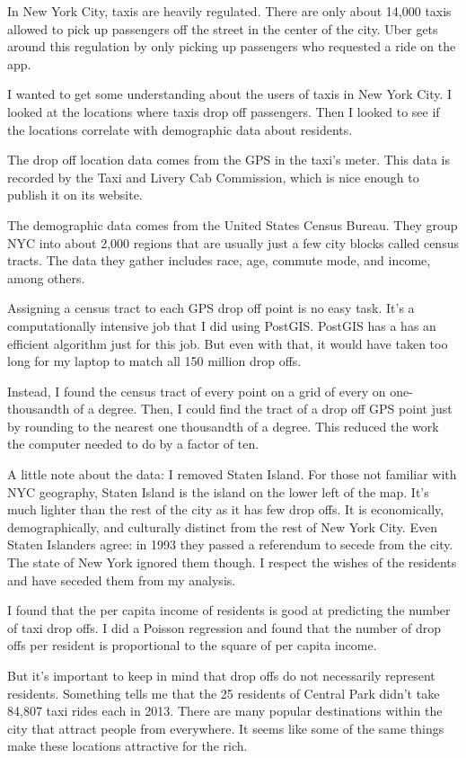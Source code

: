 In New York City, taxis are heavily regulated. There are only about 14,000 taxis allowed to pick up passengers off the street in the center of the city. Uber gets around this regulation by only picking up passengers who requested a ride on the app.

I wanted to get some understanding about the users of taxis in New York City.  I looked at the locations where taxis drop off passengers. Then I looked to see if the locations correlate with demographic data about residents.

The drop off location data comes from the GPS in the taxi's meter. This data is recorded by the Taxi and Livery Cab Commission, which is nice enough to publish it on its website.

The demographic data comes from the United States Census Bureau.  They group NYC into about 2,000 regions that are usually just a few city blocks called census tracts. The data they gather includes race, age, commute mode, and income, among others.

Assigning a census tract to each GPS drop off point is no easy task. It's a computationally intensive job that I did using PostGIS. PostGIS has a has an efficient algorithm just for this job. But even with that, it would have taken too long for my laptop to match all 150 million drop offs.

Instead, I found the census tract of every point on a grid of every on one-thousandth of a degree. Then, I could find the tract of a drop off GPS point just by rounding to the nearest one thousandth of a degree. This reduced the work the computer needed to do by a factor of ten.

A little note about the data: I removed Staten Island. For those not familiar with NYC geography, Staten Island is the island on the lower left of the map. It's much lighter than the rest of the city as it has few drop offs. It is economically, demographically, and culturally distinct from the rest of New York City. Even Staten Islanders agree: in 1993 they passed a referendum to secede from the city. The state of New York ignored them though. I respect the wishes of the residents and have seceded them from my analysis.

I found that the per capita income of residents is good at predicting the number of taxi drop offs. I did a Poisson regression and found that the number of drop offs per resident is proportional to the square of per capita income.

But it's important to keep in mind that drop offs do not necessarily represent residents. Something tells me that the 25 residents of Central Park didn't take 84,807 taxi rides each in 2013. There are many popular destinations within the city that attract people from everywhere. It seems like some of the same things make these locations attractive for the rich.

